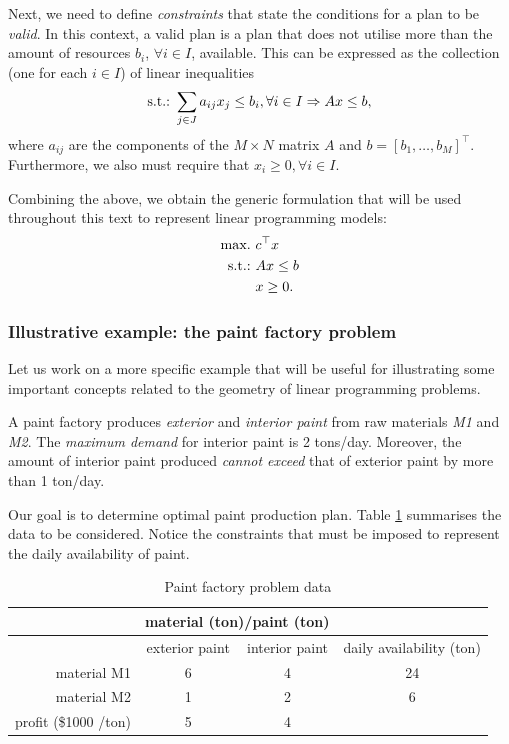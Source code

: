 Next, we need to define \emph{constraints} that state the conditions for a plan to be \emph{valid}. In this context, a valid plan is a plan that does not utilise more than the amount of resources $b_i$, $\forall i \in I$, available. This can be expressed as the collection (one for each $i \in I$) of linear inequalities
%
\begin{equation*}
	\mathop{\text{s.t.:~}} \sum_{j \in J} a_{ij}x_j \leq b_i, \forall i \in I	\Rightarrow	Ax \leq b,
\end{equation*}
%
where $a_{ij}$ are the components of the $M \times N$ matrix $A$ and $b = [b_1,\dots, b_M]^\top$. Furthermore, we also must require that $x_i \geq 0, \forall i \in I$.                                                                                                         

Combining the above, we obtain the generic formulation that will be used throughout this text to represent linear programming models:
%
\begin{align}
	\mathop{\text{max.~}} & c^\top x  \label{p1c1:eq:LP_objective} \\
	\mathop{\text{s.t.:~}}   & Ax \leq b \label{p1c1:eq:LP_constraint} \\
		  & x \geq 0. \label{p1c1:eq:LP_domain}
\end{align}
%


\subsubsection{Illustrative example: the paint factory problem}
 
Let us work on a more specific example that will be useful for illustrating some important concepts related to the geometry of linear programming problems.

A paint factory produces \emph{exterior} and \emph{interior paint} from raw materials \emph{M1} and \emph{M2}. The \emph{maximum demand} for interior paint is 2 tons/day. Moreover, the amount of interior paint produced \emph{cannot exceed} that of exterior paint by more than 1 ton/day. 

Our goal is to determine optimal paint production plan. Table \ref{p1c1:tab:paint_factory_problem_data} summarises the data to be considered. Notice the constraints that must be imposed to represent the daily availability of paint.

\begin{table}[h]
	\begin{tabular}{rccc} \hline
	&\multicolumn{2}{c}{material (ton)/paint (ton)}\\ \hline
	& exterior paint & interior paint & daily availability (ton)\\ \hline
	material M1 & 6 & 4 & 24\\
	material M2 & 1 & 2 & 6\\ \hline
	profit (\$1000 /ton) & 5 & 4\\ \hline
	\end{tabular}
	\caption{Paint factory problem data} \label{p1c1:tab:paint_factory_problem_data}
\end{table}

